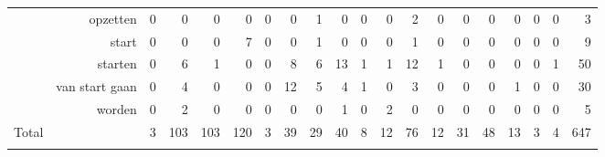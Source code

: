 \begin{table}[h]
{\begin{tabularx}{1.5\textwidth}{Xrrrrrrrrrrrrrrrrrrr}
& opzetten &  0 &  0 &  0 &  0 &  0 &  0 &  1 &  0 &  0 &  0 &  2 &  0 &  0 &  0 &  0 &  0 &  0 &  3\\
& start &  0 &  0 &  0 &  7 &  0 &  0 &  1 &  0 &  0 &  0 &  1 &  0 &  0 &  0 &  0 &  0 &  0 &  9\\
& starten &  0 &  6 &  1 &  0 &  0 &  8 &  6 &  13 &  1 &  1 &  12 &  1 &  0 &  0 &  0 &  0 &  1 &  50\\
& van start gaan &  0 &  4 &  0 &  0 &  0 &  12 &  5 &  4 &  1 &  0 &  3 &  0 &  0 &  0 &  1 &  0 &  0 &  30\\
& worden &  0 &  2 &  0 &  0 &  0 &  0 &  0 &  1 &  0 &  2 &  0 &  0 &  0 &  0 &  0 &  0 &  0 &  5\\
Total & & 3 &  103 &  103 &  120 &  3 &  39 &  29 &  40 &  8 &  12 &  76 &  12 &  31 &  48 &  13 &  3 &  4 &  647\\
\lspbottomrule
\end{tabularx}
}
\end{table}

\newpage
